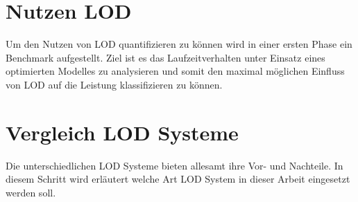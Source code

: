 \section{Nutzen LOD}
Um den Nutzen von LOD quantifizieren zu können wird in einer ersten Phase ein Benchmark aufgestellt.
Ziel ist es das Laufzeitverhalten unter Einsatz eines optimierten Modelles zu analysieren und somit den maximal möglichen Einfluss von LOD auf die Leistung klassifizieren zu können.

\section{Vergleich LOD Systeme}
Die unterschiedlichen LOD Systeme bieten allesamt ihre Vor- und Nachteile. In diesem Schritt wird erläutert welche Art LOD System in dieser Arbeit eingesetzt werden soll.
